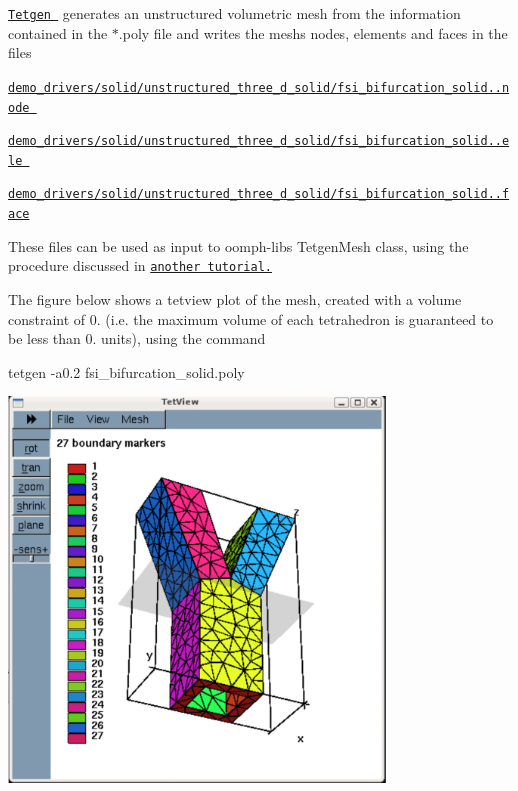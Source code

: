 \href{http://wias-berlin.de/software/tetgen//}{\tt {\ttfamily Tetgen} } generates an unstructured volumetric mesh from the information contained in the {\ttfamily $\ast$.poly} file and writes the mesh\textquotesingle{}s nodes, elements and faces in the files
\begin{DoxyItemize}
\item \href{../../../../demo_drivers/solid/unstructured_three_d_solid/fsi_bifurcation_solid.1.node}{\tt demo\+\_\+drivers/solid/unstructured\+\_\+three\+\_\+d\+\_\+solid/fsi\+\_\+bifurcation\+\_\+solid..\+node }
\item \href{../../../../demo_drivers/solid/unstructured_three_d_solid/fsi_bifurcation_solid.1.ele}{\tt demo\+\_\+drivers/solid/unstructured\+\_\+three\+\_\+d\+\_\+solid/fsi\+\_\+bifurcation\+\_\+solid..\+ele }
\item \href{../../../../demo_drivers/solid/unstructured_three_d_solid/fsi_bifurcation_solid.1.face}{\tt demo\+\_\+drivers/solid/unstructured\+\_\+three\+\_\+d\+\_\+solid/fsi\+\_\+bifurcation\+\_\+solid..\+face}
\end{DoxyItemize}These files can be used as input to {\ttfamily oomph-\/lib\textquotesingle{}s} {\ttfamily Tetgen\+Mesh} class, using the procedure discussed in \href{../../../meshes/mesh_from_tetgen/html/index.html}{\tt another tutorial.}

The figure below shows a {\ttfamily tetview} plot of the mesh, created with a volume constraint of 0. (i.\+e. the maximum volume of each tetrahedron is guaranteed to be less than 0. units), using the command 
\begin{DoxyCode}
tetgen -a0.2 fsi\_bifurcation\_solid.poly 
\end{DoxyCode}


 
\begin{DoxyImage}
\includegraphics[width=0.75\textwidth]{mesh_boundaries}
\end{DoxyImage}


